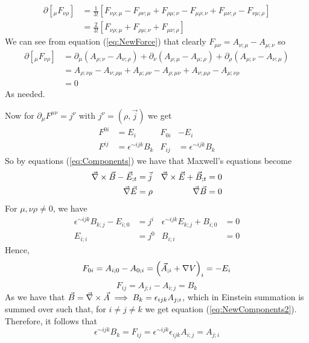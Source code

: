 \documentclass{article}
\begin{document}
	\begin{align*}
		\partial \left[_\mu F_{\nu\rho} \right]
		&= \frac{1}{3!} \left[F_{\nu\rho;\mu} - F_{\rho\nu;\mu} + F_{\rho\mu;\nu} - F_{\mu\rho;\nu} + F_{\mu\nu;\rho} - F_{\nu\mu;\rho}\right] \\
		&= \frac{2}{3!} \left[ F_{\nu\rho;\mu} + F_{\rho\mu;\nu} + F_{\mu\nu;\rho}\right]
	\end{align*}
	We can see from equation (\ref{eq:NewForce}) that clearly $F_{\mu\nu} = A_{\nu;\mu} - A_{\mu;\nu}$ so
	\begin{align*}
		\partial \left[_\mu F_{\nu\rho} \right] &=
		\partial_{\mu} \left( A_{\rho;\nu} - A_{\nu;\rho}\right) + \partial_{\nu} \left( A_{\rho;\mu} - A_{\mu;\rho}\right) + \partial_{\rho} \left( A_{\mu;\nu} - A_{\nu;\mu}\right) \\
		&= A_{\rho;\nu\mu} - A_{\nu;\rho\mu} + A_{\mu;\rho\nu} - A_{\rho;\mu\nu} + A_{\nu;\mu\rho} - A_{\mu;\nu\rho} \\
		&= 0 
	\end{align*}
	As needed.
	
	Now for $\partial_\mu F^{\mu\nu} = j^\nu$ with $j^\nu = \left( \rho, \vec{j}\right)$ we get
	\begin{align}
		\label{eq:Components}
		\nonumber
		F^{0i} &= E_i & F_{0i} & -E_i \\
		F^{ij} &= \epsilon^{\sim ijk} B_k &
		F_{ij} &=  \epsilon^{\sim ijk} B_k
	\end{align}
	So by equations (\ref{eq:Components}) we have that Maxwell's equations become
	\begin{align}
		\nonumber\label{eq:MaxwellEquations}
		\vec{\nabla} \times \vec{B} - \vec{E}_{;t} &= \vec{j} &
		\vec{\nabla} \times \vec{E} + \vec{B}_{;t} &= 0 \\
		\vec{\nabla} \vec{E} &= \rho & \vec{\nabla} \vec{B} &= 0
 	\end{align}
 	For $\mu,\nu\rho \neq 0$, we have
 	\begin{align*}
 		\epsilon^{\sim ijk} B_{k;j} - E_{i;0} &= j^i & \epsilon^{\sim ijk} E_{k;j} + B_{i;0} &= 0\\ E_{i;i} &=j^0 & B_{i;i} &= 0
 	\end{align*}
 	Hence,
 	\begin{equation}
 		\label{eq:NewComponents1}
 		F_{0i} = A_{i;0} - A_{0;i} = \left( \vec{A}_{;i} + \nabla V\right)_i = -E_{i}
 	\end{equation}
 	\begin{equation}
 		\label{eq:NewComponents2}
 		F_{ij} = A_{j;i} - A_{i;j} = B_k
 	\end{equation}
 	As we have that $\vec{B} = \vec{\nabla} \times \vec{A} \implies B_k = \epsilon_{ijk} A_{j;i}$, which in Einstein summation is summed over such that, for $i \neq j \neq k$ we get equation (\ref{eq:NewComponents2}). Therefore, it follows that
 	\begin{equation}
 		\label{eq:NewComponents3}
 		\epsilon^{\sim ijk} B_k = F_{ij} = \epsilon^{\sim ijk} \epsilon_{ijk}A_{i;j}= A_{j;i}
 	\end{equation}
 
\end{document}
